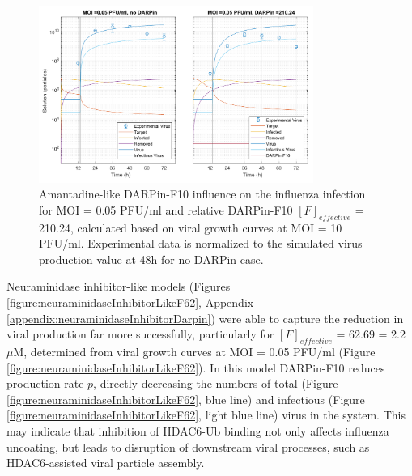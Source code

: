 \begin{figure}
\begin{center}
\includegraphics[width=0.8\textwidth, trim={0cm 0cm 0cm 0cm}, clip]{D_chapters/3_DARPinModels/2_DARPinInfection/comparisonModelTHillIRVViDelayMOI0.072135DARPin210.236AsymmetricDarpinMyosinInhibitor.pdf}
\caption[Amantadine-like DARPin-F10 for MOI = 0.05 PFU/ml and $F_{effective}$ = 210.24]{Amantadine-like DARPin-F10 influence on the influenza infection for MOI = 0.05 PFU/ml and relative DARPin-F10 $[F]_{effective}$ = 210.24, calculated based on viral growth curves at MOI = 10 PFU/ml. Experimental data is normalized to  the simulated virus production value at 48h for no DARPin case.}
\label{figure:amantadineLikeF210}
\end{center}
\end{figure}

Neuraminidase inhibitor-like models (Figures \ref{figure:neuraminidaseInhibitorLikeF62}, Appendix \ref{appendix:neuraminidaseInhibitorDarpin}) were able to capture the reduction in viral production far more successfully, particularly for $[F]_{effective}$ = 62.69 = 2.2 $\mu$M, determined from viral growth curves at MOI = 0.05 PFU/ml (Figure \ref{figure:neuraminidaseInhibitorLikeF62}). In this model DARPin-F10 reduces production rate $p$, directly decreasing the numbers of total (Figure \ref{figure:neuraminidaseInhibitorLikeF62}, blue line) and infectious (Figure \ref{figure:neuraminidaseInhibitorLikeF62}, light blue line) virus in the system. This may indicate that inhibition of HDAC6-Ub binding not only affects influenza uncoating, but leads to disruption of downstream viral processes, such as HDAC6-assisted viral particle assembly.

